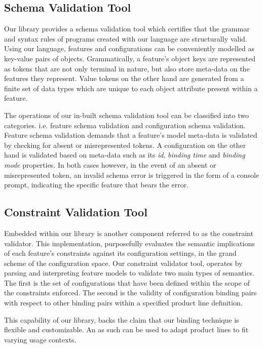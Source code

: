 \documentclass[conference]{IEEEtran}
\begin{document}
  \subsection{Schema Validation Tool} Our library provides a schema validation tool which certifies that the grammar and syntax rules of programs created with our language are structurally valid. Using our language, features and configurations can be conveniently modelled as key-value pairs of objects. Grammatically, a feature's object keys are represented as tokens that are not only terminal in nature, but also store meta-data on the features they represent. Value tokens on the other hand are generated from a finite set of data types which are unique to each object attribute present within a feature.
  
  The operations of our in-built schema validation tool can be classified into two categories. i.e. feature schema validation and configuration schema validation. Feature schema validation demands that a feature's model meta-data is validated by checking for absent or misrepresented tokens. A configuration on the other hand is validated based on meta-data such as its \textit{id}, \textit{binding time} and \textit{binding mode} properties. In both cases however, in the event of an absent or misrepresented token, an invalid schema error is triggered in the form of a console prompt, indicating the specific feature that bears the error.
  
  \subsection{Constraint Validation Tool} Embedded within our library is another component referred to as the constraint validator. This implementation, purposefully evaluates the semantic implications of each feature's constraints against its configuration settings, in the grand scheme of the configuration space. Our constraint validator tool, operates by parsing and interpreting feature models to validate two main types of semantics. The first is the set of configurations that have been defined within the scope of the constraints enforced. The second is the validity of configuration binding pairs with respect to other binding pairs within a specified product line definition.
  
 This capability of our library, backs the claim that our binding technique is flexible and customizable. An as such can be used to adapt product lines to fit varying usage contexts.
\end{document}
